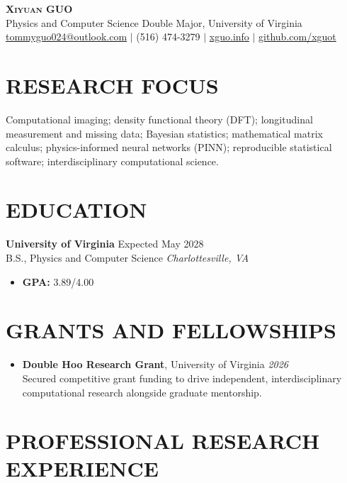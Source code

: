 \documentclass[11pt, letterpaper]{article}
\newenvironment{cvitemize}{
    \begin{itemize}[leftmargin=0.2in, label={\textbullet}, itemsep=4pt, parsep=0pt, topsep=4pt]
}{
    \end{itemize}
}
\newcommand{\cvheading}[4]{
    \vspace{4pt}
    \noindent\textbf{#1} \hfill #2 \\
    #3 \hfill \textit{#4} \vspace{2pt}
}
\begin{document}
\begin{center}
    {\Huge \scshape \textbf{Xiyuan GUO}} \\ \vspace{8pt}
    Physics and Computer Science Double Major, University of Virginia \\ \vspace{4pt}
    \href{mailto:tommyguo024@outlook.com}{tommyguo024@outlook.com} $\vert$ (516) 474-3279 $\vert$ \href{https://xguo.info}{xguo.info} $\vert$ \href{https://github.com/xguot}{github.com/xguot}
\end{center}
\vspace{8pt}

\section{RESEARCH FOCUS}
\noindent Computational imaging; density functional theory (DFT); longitudinal measurement and missing data; Bayesian statistics; mathematical matrix calculus; physics-informed neural networks (PINN); reproducible statistical software; interdisciplinary computational science.

\section{EDUCATION}
\cvheading{University of Virginia}{Expected May 2028}{B.S., Physics and Computer Science}{Charlottesville, VA}
\begin{cvitemize}
    \item \textbf{GPA:} 3.89/4.00
\end{cvitemize}

\section{GRANTS AND FELLOWSHIPS}
\begin{cvitemize}
    \item \textbf{Double Hoo Research Grant}, University of Virginia \hfill \textit{2026} \\
    \small{Secured competitive grant funding to drive independent, interdisciplinary computational research alongside graduate mentorship.}
\end{cvitemize}

\section{PROFESSIONAL RESEARCH EXPERIENCE}
\end{document}
